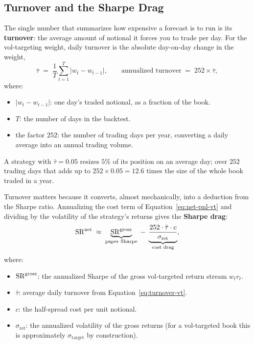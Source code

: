 \subsection{Turnover and the Sharpe Drag}
\label{subsec:turnover-drag}

The single number that summarizes how expensive a forecast is to run is its \textbf{turnover}: the average amount of notional it forces you to trade per day. For the vol-targeting weight, daily turnover is the absolute day-on-day change in the weight,
\begin{equation}
\label{eq:turnover-vt}
\bar\tau \;=\; \frac{1}{T}\sum_{t=1}^{T} |w_t - w_{t-1}|,
\qquad
\text{annualized turnover} \;=\; 252 \times \bar\tau,
\end{equation}
where:
\begin{itemize}[nosep]
  \item $|w_t - w_{t-1}|$: one day's traded notional, as a fraction of the book.
  \item $T$: the number of days in the backtest.
  \item the factor $252$: the number of trading days per year, converting a daily average into an annual trading volume.
\end{itemize}
A strategy with $\bar\tau = 0.05$ resizes $5\%$ of its position on an average day; over $252$ trading days that adds up to $252 \times 0.05 = 12.6$ times the size of the whole book traded in a year.

Turnover matters because it converts, almost mechanically, into a deduction from the Sharpe ratio. Annualizing the cost term of Equation~\eqref{eq:net-pnl-vt} and dividing by the volatility of the strategy's returns gives the \textbf{Sharpe drag}:
\begin{equation}
\label{eq:sharpe-drag}
\operatorname{SR}^{\text{net}} \;\approx\; \underbrace{\operatorname{SR}^{\text{gross}}}_{\text{paper Sharpe}} \;-\; \underbrace{\frac{252 \cdot \bar\tau \cdot c}{\sigma_{\text{ret}}}}_{\text{cost drag}},
\end{equation}
where:
\begin{itemize}[nosep]
  \item $\operatorname{SR}^{\text{gross}}$: the annualized Sharpe of the gross vol-targeted return stream $w_t r_t$.
  \item $\bar\tau$: average daily turnover from Equation~\eqref{eq:turnover-vt}.
  \item $c$: the half-spread cost per unit notional.
  \item $\sigma_{\text{ret}}$: the annualized volatility of the gross returns (for a vol-targeted book this is approximately $\sigma_{\text{target}}$ by construction).
\end{itemize}

